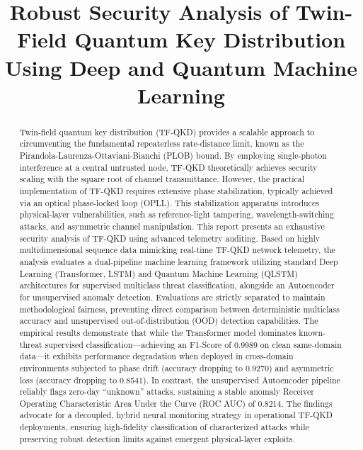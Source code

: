 \documentclass[conference]{IEEEtran}
\begin{document}
\title{Robust Security Analysis of Twin-Field Quantum Key Distribution Using Deep and Quantum Machine Learning}

\author{
}

\maketitle

\begin{abstract}
Twin-field quantum key distribution (TF-QKD) provides a scalable approach to circumventing the fundamental repeaterless rate-distance limit, known as the Pirandola-Laurenza-Ottaviani-Bianchi (PLOB) bound. By employing single-photon interference at a central untrusted node, TF-QKD theoretically achieves security scaling with the square root of channel transmittance. However, the practical implementation of TF-QKD requires extensive phase stabilization, typically achieved via an optical phase-locked loop (OPLL). This stabilization apparatus introduces physical-layer vulnerabilities, such as reference-light tampering, wavelength-switching attacks, and asymmetric channel manipulation. This report presents an exhaustive security analysis of TF-QKD using advanced telemetry auditing. Based on highly multidimensional sequence data mimicking real-time TF-QKD network telemetry, the analysis evaluates a dual-pipeline machine learning framework utilizing standard Deep Learning (Transformer, LSTM) and Quantum Machine Learning (QLSTM) architectures for supervised multiclass threat classification, alongside an Autoencoder for unsupervised anomaly detection. Evaluations are strictly separated to maintain methodological fairness, preventing direct comparison between deterministic multiclass accuracy and unsupervised out-of-distribution (OOD) detection capabilities. The empirical results demonstrate that while the Transformer model dominates known-threat supervised classification---achieving an F1-Score of 0.9989 on clean same-domain data---it exhibits performance degradation when deployed in cross-domain environments subjected to phase drift (accuracy dropping to 0.9270) and asymmetric loss (accuracy dropping to 0.8541). In contrast, the unsupervised Autoencoder pipeline reliably flags zero-day ``unknown'' attacks, sustaining a stable anomaly Receiver Operating Characteristic Area Under the Curve (ROC AUC) of 0.8214. The findings advocate for a decoupled, hybrid neural monitoring strategy in operational TF-QKD deployments, ensuring high-fidelity classification of characterized attacks while preserving robust detection limits against emergent physical-layer exploits.
\end{abstract}
\end{document}

